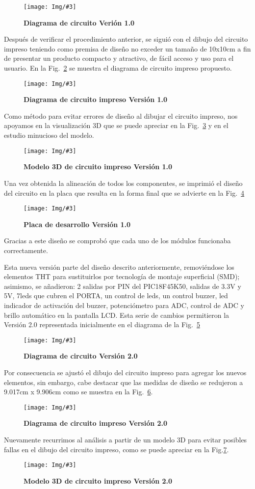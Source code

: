 \documentclass[times, 10pt,twocolumn]{article}
\newcommand{\Img}[5]{
   \begin{figure}[H]
   	   \centering
       \texttt{[image: Img/\#3]}
       \caption{ \centering \textbf{\small #4}}
       \label{#5}
       \end{figure}
   }
\begin{document}
\Img{8.5cm}{6.3cm}{Primera_Version.pdf}{Diagrama de circuito Verión 1.0}{fig:1} Después de verificar el procedimiento anterior, se siguió con el dibujo del circuito impreso teniendo como premisa de diseño no exceder un tamaño de 10x10cm a fin de presentar un producto compacto y atractivo, de fácil acceso y uso para el usuario.
En la Fig.~\ref{fig:2} se muestra el diagrama de circuito impreso propuesto.
\Img{6.5cm}{6.0cm}{primera_version_pcb}{Diagrama de circuito impreso Versión 1.0}{fig:2}
Como método para evitar errores de diseño al dibujar el circuito impreso, nos apoyamos en la visualización 3D que se puede apreciar en la Fig.~\ref{fig:3} y en el estudio minucioso del modelo.
\Img{8.5cm}{7.0cm}{primera_version_3d}{Modelo 3D de circuito impreso Versión 1.0}{fig:3}
Una vez obtenida la alineación de todos los componentes, se imprimió el diseño del circuito en la placa que resulta en la forma final que se advierte en la Fig.~\ref{fig:4}
\Img{8.5cm}{7.0cm}{primera_version_final}{Placa de desarrollo Versión 1.0}{fig:4} 
Gracias a este diseño se comprobó que cada uno de los módulos funcionaba correctamente. 


Esta nueva versión parte del diseño descrito anteriormente, removiéndose los elementos THT para sustituirlos por tecnología de montaje superficial (SMD); asimismo, se añadieron: 2 salidas por PIN del PIC18F45K50, salidas de 3.3V y 5V, 7leds que cubren el PORTA, un control de leds, un control buzzer, led indicador de activación del buzzer, potenciómetro para ADC, control de ADC y brillo automático en la pantalla LCD. Esta serie de cambios permitieron la Versión 2.0 representada inicialmente en el diagrama de la Fig.~\ref{fig:5}
\Img{8.0cm}{5.5cm}{Segunda_Version}{Diagrama de circuito Versión 2.0}{fig:5}

Por consecuencia se ajustó el dibujo del circuito impreso para agregar los nuevos elementos, sin embargo, cabe destacar que las medidas de diseño se redujeron a 9.017cm x 9.906cm como se muestra en la Fig.~\ref{fig:6}. 
\Img{6.5cm}{6.0cm}{segunda_version_pcb}{Diagrama de circuito impreso Versión 2.0}{fig:6}

Nuevamente recurrimos al análisis a partir de un modelo 3D para evitar posibles fallas en el dibujo del circuito impreso, como se puede apreciar en la Fig.\ref{fig:7}.
\Img{7.5cm}{6.2cm}{segunda_version_3d}{Modelo 3D de circuito impreso Versión 2.0}{fig:7}
\end{document}
